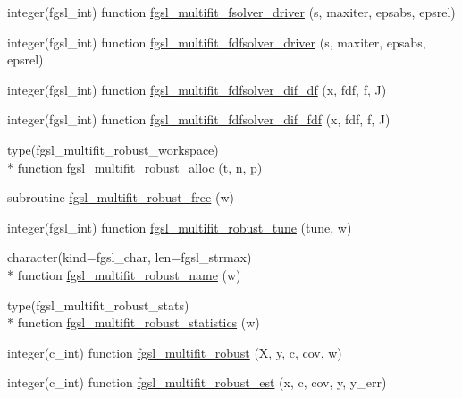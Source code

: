 \begin{DoxyCompactItemize}
\item 
integer(fgsl\-\_\-int) function \hyperlink{multifit_8finc_a441635d79b414434f17d9e79d5e5e3bf}{fgsl\-\_\-multifit\-\_\-fsolver\-\_\-driver} (s, maxiter, epsabs, epsrel)
\item 
integer(fgsl\-\_\-int) function \hyperlink{multifit_8finc_a4bac0cd0093298664c6efd1af42e676a}{fgsl\-\_\-multifit\-\_\-fdfsolver\-\_\-driver} (s, maxiter, epsabs, epsrel)
\item 
integer(fgsl\-\_\-int) function \hyperlink{multifit_8finc_aa6720e02a7bfdea705f5efeaaf4f065c}{fgsl\-\_\-multifit\-\_\-fdfsolver\-\_\-dif\-\_\-df} (x, fdf, f, J)
\item 
integer(fgsl\-\_\-int) function \hyperlink{multifit_8finc_a20b830d4e502085fe3ae081e400a88c9}{fgsl\-\_\-multifit\-\_\-fdfsolver\-\_\-dif\-\_\-fdf} (x, fdf, f, J)
\item 
type(fgsl\-\_\-multifit\-\_\-robust\-\_\-workspace) \\*
function \hyperlink{multifit_8finc_a3654cf72cc42ef37e8ffe3d6ae99d1b0}{fgsl\-\_\-multifit\-\_\-robust\-\_\-alloc} (t, n, p)
\item 
subroutine \hyperlink{multifit_8finc_ac11e8d149c1983ababeef2251b4a0e0f}{fgsl\-\_\-multifit\-\_\-robust\-\_\-free} (w)
\item 
integer(fgsl\-\_\-int) function \hyperlink{multifit_8finc_ab6c0101ec41f2a22cc3441476266d59d}{fgsl\-\_\-multifit\-\_\-robust\-\_\-tune} (tune, w)
\item 
character(kind=fgsl\-\_\-char, len=fgsl\-\_\-strmax) \\*
function \hyperlink{multifit_8finc_a60a15f7b62aa2c94615909be755ddb56}{fgsl\-\_\-multifit\-\_\-robust\-\_\-name} (w)
\item 
type(fgsl\-\_\-multifit\-\_\-robust\-\_\-stats) \\*
function \hyperlink{multifit_8finc_a75250ed81d817a7a428dd8ec8adc08dd}{fgsl\-\_\-multifit\-\_\-robust\-\_\-statistics} (w)
\item 
integer(c\-\_\-int) function \hyperlink{multifit_8finc_af06ff4c9c8558a30bdf902feb7052d92}{fgsl\-\_\-multifit\-\_\-robust} (X, y, c, cov, w)
\item 
integer(c\-\_\-int) function \hyperlink{multifit_8finc_add53db0407ecf7e59f5be47df7b6f6ed}{fgsl\-\_\-multifit\-\_\-robust\-\_\-est} (x, c, cov, y, y\-\_\-err)
\end{DoxyCompactItemize}


